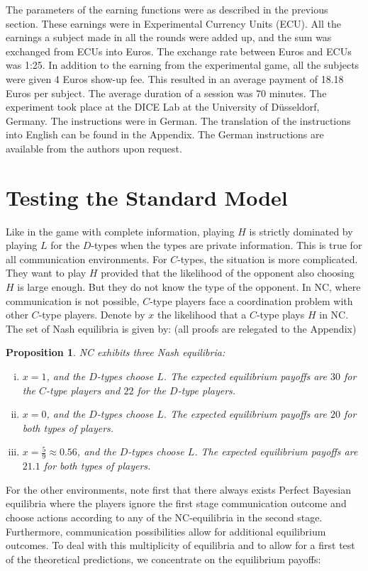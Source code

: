 \documentclass[12pt]{article}
\newtheorem{proposition}{Proposition} \theoremstyle{definition}
\theoremstyle{break}
\begin{document}
The parameters of the earning functions were as described in the previous section. These earnings were in Experimental Currency Units (ECU). All the earnings a subject made in all the rounds were added up, and the sum was exchanged from ECUs into Euros. The exchange rate between Euros and ECUs was 1:25. In addition to the earning from the experimental game, all the subjects were given 4 Euros show-up fee. This resulted in an average payment of 18.18 Euros per subject. The average duration of a session was 70 minutes. The experiment took place at the DICE Lab at the University of D\"{u}sseldorf, Germany. The instructions were in German. The translation of the instructions into English can be found in the Appendix. The German instructions are available from the authors upon request.

\section{Testing the Standard Model}\label{sec:standard-setting}

Like in the game with complete information, playing $H$ is strictly dominated by playing $L$ for the $D$-types when the types are private information. This is true for all communication environments. For $C$-types, the situation is more complicated. They want to play $H$ provided that the likelihood of the opponent also choosing $H$ is large enough. But they do not know the type of the opponent. In NC, where communication is not possible, $C$-type players face a coordination problem with other $C$-type players. Denote by $x$ the likelihood that a $C$-type plays $H$ in NC. The set of Nash equilibria is given by: (all proofs are relegated to the Appendix)
%
\begin{proposition}\label{prop:NC} NC exhibits three Nash equilibria:
	\begin{enumerate}[i)]\setlength\itemsep{0em}
		\item $x = 1$, and the $D$-types choose $L$. The expected equilibrium payoffs are $30$ for the $C$-type players and $22$ for the $D$-type players.
		\item $x = 0$, and the $D$-types choose $L$. The expected equilibrium payoffs are $20$ for both types of  players.
		\item $x = \frac{5}{9}\approx 0.56$, and the $D$-types choose $L$. The expected equilibrium payoffs are $21.1$ for both types of players.
	\end{enumerate}
\end{proposition}
%
For the other environments, note first that there always exists Perfect Bayesian equilibria where the players ignore the first stage communication outcome and choose actions according to any of the NC-equilibria in the second stage. Furthermore, communication possibilities allow for additional equilibrium outcomes. To deal with this multiplicity of equilibria and to allow for a first test of the theoretical predictions, we concentrate on the equilibrium payoffs: 
\end{document}
